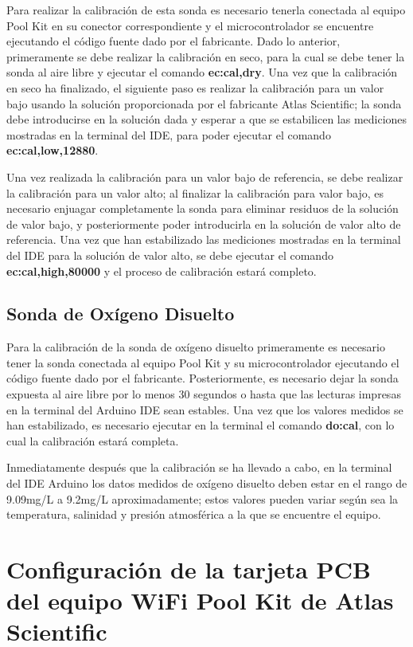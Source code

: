 Para realizar la calibración de esta sonda es necesario tenerla conectada al equipo Pool Kit en su conector correspondiente y el microcontrolador se encuentre ejecutando el código fuente dado por el fabricante. Dado lo anterior,
primeramente se debe realizar la calibración en seco, para la cual se debe tener la sonda al aire libre y ejecutar el comando \textbf{ec:cal,dry}. Una vez que la calibración en seco ha finalizado, el siguiente paso es realizar 
la calibración para un valor bajo usando la solución proporcionada por el fabricante Atlas Scientific; la sonda debe introducirse en la solución dada y esperar a que se estabilicen las mediciones mostradas en la terminal del IDE,
para poder ejecutar el comando \textbf{ec:cal,low,12880}. 

Una vez realizada la calibración para un valor bajo de referencia, se debe realizar la calibración para un valor alto; al finalizar la calibración para valor bajo, es necesario enjuagar completamente la sonda para eliminar 
residuos de la solución de valor bajo, y posteriormente poder introducirla en la solución de valor alto de referencia. Una vez que han estabilizado las mediciones mostradas en la terminal del IDE para la solución de valor 
alto, se debe ejecutar el comando \textbf{ec:cal,high,80000} y el proceso de calibración estará completo.

\subsection{Sonda de Oxígeno Disuelto}

Para la calibración de la sonda de oxígeno disuelto primeramente es necesario tener la sonda conectada al equipo Pool Kit y su microcontrolador ejecutando el código fuente dado por el fabricante. Posteriormente, es necesario 
dejar la sonda expuesta al aire libre por lo menos 30 segundos o hasta que las lecturas impresas en la terminal del Arduino IDE sean estables. Una vez que los valores medidos se han estabilizado, es necesario ejecutar en 
la terminal el comando \textbf{do:cal}, con lo cual la calibración estará completa.

Inmediatamente después que la calibración se ha llevado a cabo, en la terminal del IDE Arduino los datos medidos de oxígeno disuelto deben estar en el rango de 9.09mg/L a 9.2mg/L aproximadamente; estos valores pueden variar 
según sea la temperatura, salinidad y presión atmosférica a la que se encuentre el equipo.

\section{Configuración de la tarjeta PCB del equipo WiFi Pool Kit de Atlas Scientific}

